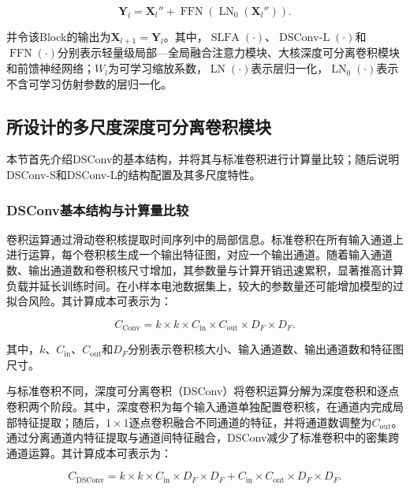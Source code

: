 \begin{equation}
\mathbf Y_l
=
\mathbf X_l''+
\operatorname{FFN}
\left(
\operatorname{LN}_0(\mathbf X_l'')
\right).
\label{eq:block_ffn}
\end{equation}

并令该Block的输出为$\mathbf X_{l+1}=\mathbf Y_l$。其中，$\operatorname{SLFA}(\cdot)$、$\operatorname{DSConv\text{-}L}(\cdot)$和$\operatorname{FFN}(\cdot)$分别表示轻量级局部—全局融合注意力模块、大核深度可分离卷积模块和前馈神经网络；$W_l$为可学习缩放系数，$\operatorname{LN}(\cdot)$表示层归一化，$\operatorname{LN}_0(\cdot)$表示不含可学习仿射参数的层归一化。

\subsection{所设计的多尺度深度可分离卷积模块}

本节首先介绍DSConv的基本结构，并将其与标准卷积进行计算量比较；随后说明DSConv-S和DSConv-L的结构配置及其多尺度特性。



\subsubsection{DSConv基本结构与计算量比较}

卷积运算通过滑动卷积核提取时间序列中的局部信息\cite{ref71}。标准卷积在所有输入通道上进行运算，每个卷积核生成一个输出特征图，对应一个输出通道。随着输入通道数、输出通道数和卷积核尺寸增加，其参数量与计算开销迅速累积，显著推高计算负载并延长训练时间。在小样本电池数据集上，较大的参数量还可能增加模型的过拟合风险。其计算成本可表示为：

\begin{equation}
C_{\mathrm{Conv}}
=
k\times k\times C_{\mathrm{in}}\times C_{\mathrm{out}}\times D_F\times D_F.
\label{eq:conv_cost}
\end{equation}

其中，$k$、$C_{\mathrm{in}}$、$C_{\mathrm{out}}$和$D_F$分别表示卷积核大小、输入通道数、输出通道数和特征图尺寸。

与标准卷积不同，深度可分离卷积（DSConv）将卷积运算分解为深度卷积和逐点卷积两个阶段\cite{ref71}。其中，深度卷积为每个输入通道单独配置卷积核，在通道内完成局部特征提取；随后，$1\times1$逐点卷积融合不同通道的特征，并将通道数调整为$C_{\mathrm{out}}$。通过分离通道内特征提取与通道间特征融合，DSConv减少了标准卷积中的密集跨通道运算。其计算成本可表示为：

\begin{equation}
C_{\mathrm{DSConv}}
=
k\times k\times C_{\mathrm{in}}\times D_F\times D_F
+
C_{\mathrm{in}}\times C_{\mathrm{out}}\times D_F\times D_F.
\label{eq:dsconv_cost}
\end{equation}

